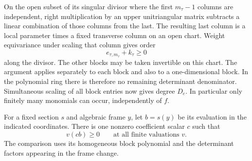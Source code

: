 On the open subset of its singular divisor where
the first \(m_\tau-1\) columns are independent, right
multiplication by an upper unitriangular matrix subtracts a
linear combination of those columns from the last. The
resulting last column is a local parameter times a fixed
transverse column on an open chart. Weight equivariance under
scaling that column gives order
\[
 e_{\tau,m_\tau}+k_\tau\ge0
\]
along the divisor.
The other blocks may be taken invertible on this chart.
The argument applies separately to each block
and also to a one-dimensional block. In the polynomial ring
there is therefore no remaining determinant denominator.
Simultaneous scaling of all block entries now gives degree
\(D_e\). In particular only finitely many monomials can occur,
independently of \(f\).
\label{cor:deep-cover-denominators-3}

\begin{lemma}
\label{lem:deep-cover-frame-clearing}
For a fixed section \(s\) and algebraic frame \(y\), let \(b=s(y)\) be its evaluation in the indicated coordinates. There is one nonzero coefficient scalar \(c\) such that
\[
 v(cb)\ge0\qquad\text{at all finite valuations }v.
\]
 The comparison uses its homogeneous block
polynomial and the determinant factors appearing in the frame
change.
\end{lemma}

